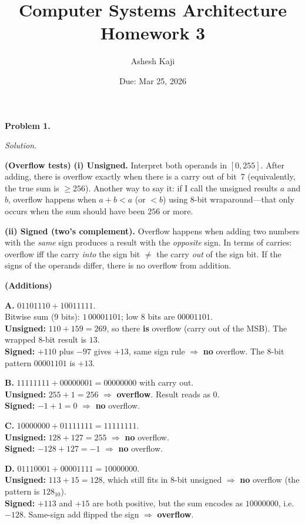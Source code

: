 \documentclass[12pt]{article}
\title{Computer Systems Architecture\\Homework 3}
\author{Ashesh Kaji}
\date{Due: Mar 25, 2026}
\newcommand{\problem}[1]{\vspace{0.8em}\noindent\textbf{Problem #1.}\vspace{0.35em}}
\newenvironment{solution}{\par\noindent\textit{Solution.}\ }{\par\vspace{1.1em}}
\newcommand{\subproblem}[1]{\par\vspace{0.45em}\noindent\textbf{(#1)}\quad}
\begin{document}
\maketitle

\problem{1}
\begin{solution}

\subproblem{Overflow tests}
\textbf{(i) Unsigned.} Interpret both operands in $[0,255]$. After adding, there is overflow exactly when there is a carry out of bit~7 (equivalently, the true sum is $\ge 256$). Another way to say it: if I call the unsigned results $a$ and $b$, overflow happens when $a+b< a$ (or $<b$) using 8-bit wraparound---that only occurs when the sum should have been $256$ or more.

\textbf{(ii) Signed (two's complement).} Overflow happens when adding two numbers with the \emph{same} sign produces a result with the \emph{opposite} sign. In terms of carries: overflow iff the carry \emph{into} the sign bit $\neq$ the carry \emph{out} of the sign bit. If the signs of the operands differ, there is no overflow from addition.

\subproblem{Additions}

\textbf{A.} $01101110 + 10011111$. \\
Bitwise sum (9 bits): $1\,00001101$; low 8 bits are $00001101$. \\
\textbf{Unsigned:} $110+159=269$, so there \textbf{is} overflow (carry out of the MSB). The wrapped 8-bit result is $13$. \\
\textbf{Signed:} $+110$ plus $-97$ gives $+13$, same sign rule $\Rightarrow$ \textbf{no} overflow. The 8-bit pattern $00001101$ is $+13$.

\textbf{B.} $11111111 + 00000001 = 00000000$ with carry out. \\
\textbf{Unsigned:} $255+1=256$ $\Rightarrow$ \textbf{overflow}. Result reads as $0$. \\
\textbf{Signed:} $-1+1=0$ $\Rightarrow$ \textbf{no} overflow.

\textbf{C.} $10000000 + 01111111 = 11111111$. \\
\textbf{Unsigned:} $128+127=255$ $\Rightarrow$ \textbf{no} overflow. \\
\textbf{Signed:} $-128+127=-1$ $\Rightarrow$ \textbf{no} overflow.

\textbf{D.} $01110001 + 00001111 = 10000000$. \\
\textbf{Unsigned:} $113+15=128$, which still fits in 8-bit unsigned $\Rightarrow$ \textbf{no} overflow (the pattern is $128_{10}$). \\
\textbf{Signed:} $+113$ and $+15$ are both positive, but the sum encodes as $10000000$, i.e.\ $-128$. Same-sign add flipped the sign $\Rightarrow$ \textbf{overflow}.
\end{solution}
\end{document}
